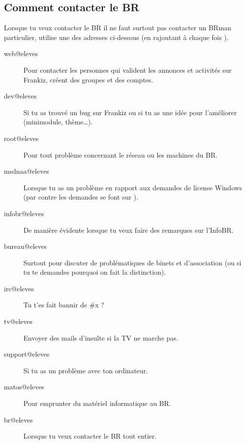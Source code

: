 \subsection{Comment contacter le BR}

Lorsque tu veux contacter le BR il ne faut surtout pas contacter un BRman particulier, utilise une des adresses ci-dessous (en rajoutant à chaque fois ).

\begin{description}

\item[web@eleves] Pour contacter les personnes qui valident les annonces et activités sur Frankiz, créent des groupes et des comptes.

\item[dev@eleves] Si tu as trouvé un bug sur Frankiz ou si tu as une idée pour l'améliorer (minimodule, thème\dots).

\item[root@eleves] Pour tout problème concernant le réseau ou les machines du BR.

\item[msdnaa@eleves] Lorsque tu as un problème en rapport aux demandes de license Windows (par contre les demandes se font sur \fkz).

\item[infobr@eleves] De manière évidente lorsque tu veux faire des remarques sur l'InfoBR.

\item[bureau@eleves] Surtout pour discuter de problématiques de binets et d'association (ou si tu te demandes pourquoi on fait la distinction). 

\item[irc@eleves] Tu t'es fait bannir de \#x ?

\item[tv@eleves] Envoyer des mails d'insulte si la TV ne marche pas.

\item[support@eleves] Si tu as un problème avec ton ordinateur.

\item[matos@eleves] Pour emprunter du matériel informatique au BR.

\item[br@eleves] Lorsque tu veux contacter le BR tout entier.

\end{description}
